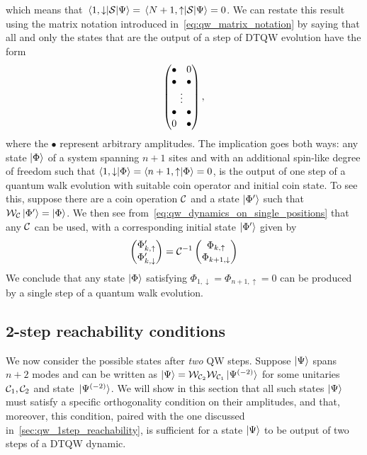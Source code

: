 which means that $\mel{1,\downarrow}{{\mathcal{S}}}{\Psi}=\mel{N+1,\uparrow}{{\mathcal{S}}}{\Psi}=0$.
We can restate this result using the matrix notation introduced in~\cref{eq:qw_matrix_notation} by saying that all and only the states that are the output of a step of \ac{DTQW} evolution have the form
\begin{equation}
    \begin{pmatrix}
        \bullet & 0 \\
        \bullet & \bullet \\
        \multicolumn{2}{c}{\vdots} \\ 
        \bullet & \bullet \\
        0 & \bullet \\
    \end{pmatrix},
    \label{eq:qw_matrix_notation_vanishing_endpoints}
\end{equation}
where the $\bullet$ represent arbitrary amplitudes.
The implication goes both ways: any state $\ket\Phi$ of a system spanning $n+1$ sites and with an additional spin-like degree of freedom such that
$
\braket{1, \downarrow}{\Phi} =
\braket{n+1, \uparrow}{\Phi} = 0
$,
is the output of one step of a quantum walk evolution with suitable coin operator and initial coin state.
To see this, suppose there are a coin operation ${\mathcal{C}}$ and a state $\ket{\Phi'}$ such that ${\mathcal{W}}_{\mathcal{C}}\ket{\Phi'}=\ket{\Phi}$.
We then see from~\cref{eq:qw_dynamics_on_single_positions} that any ${\mathcal{C}}$ can be used, with a corresponding initial state $\ket{\Phi'}$ given by
\begin{equation}
    \begin{pmatrix}
        \Phi'_{k,\uparrow} \\
        \Phi'_{k,\downarrow}
    \end{pmatrix} = {\mathcal{C}}^{-1}
    \begin{pmatrix}
        \Phi_{k,\uparrow} \\
        \Phi_{k+1,\downarrow}
    \end{pmatrix}
\end{equation}
We conclude that any state $\ket\Phi$ satisfying $\Phi_{1,\downarrow}=\Phi_{n+1,\uparrow}=0$ can be produced by a single step of a quantum walk evolution.

\subsection{2-step reachability conditions}
\label{sec:qw_2step_reachability}
We now consider the possible states after \textit{two} \ac{QW} steps.
Suppose $\ket\Psi$ spans $n+2$ modes and can be written as
$\ket\Psi={\mathcal{W}}_{{\mathcal{C}}_2}{\mathcal{W}}_{{\mathcal{C}}_1}\ket*{\Psi^{(-2)}}$
for some unitaries ${\mathcal{C}}_1,{\mathcal{C}}_2$ and state $\ket*{\Psi^{(-2)}}$.
We will show in this section that all such states $\ket\Psi$ must satisfy a specific orthogonality condition on their amplitudes, and that, moreover, this condition, paired with the one discussed in~\cref{sec:qw_1step_reachability}, is sufficient for a state $\ket\Psi$ to be output of two steps of a \ac{DTQW} dynamic.

